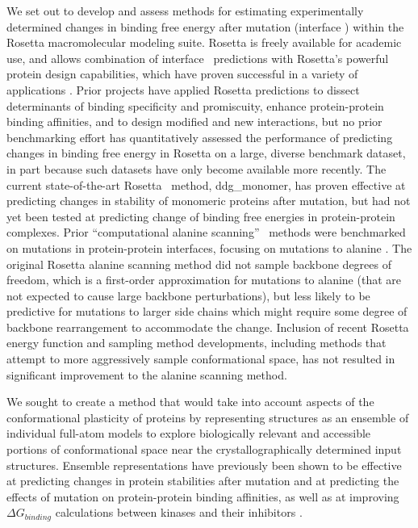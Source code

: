 We set out to develop and assess methods for estimating experimentally determined changes in binding free energy after mutation (interface \ddg) within the Rosetta macromolecular modeling suite. Rosetta is freely available for academic use, and allows combination of interface \ddg\ predictions with Rosetta's powerful protein design capabilities, which have proven successful in a variety of applications \cite{mandell_computer-aided_2009,kaufmann_practically_2010}.
Prior projects have applied Rosetta predictions to
dissect determinants of binding specificity and promiscuity\cite{boulanger_convergent_2003,mcfarland_symmetry_2003},
enhance protein-protein binding affinities\cite{sammond_structure-based_2007,song_rational_2006},
and to design modified\cite{kapp_control_2012}
and new interactions\cite{chevalier_design_2002,fleishman_computational_2011,chevalier_massively_2017}, but no prior benchmarking effort has quantitatively assessed the performance of predicting changes in binding free energy in Rosetta on a large, diverse benchmark dataset, in part because such datasets have only become available more recently.
The current state-of-the-art Rosetta \ddg\ method,  ddg\_monomer\cite{kellogg_role_2011}, has proven effective at predicting changes in stability of monomeric proteins after mutation, but had not yet been tested at predicting change of binding free energies in protein-protein complexes.
Prior ``computational alanine scanning'' \ddg\ methods were benchmarked on mutations in protein-protein interfaces, focusing on mutations to alanine \cite{kortemme_simple_2002,kortemme_computational_2004,conchuir_web_2015}.
The original Rosetta alanine scanning method\cite{kortemme_simple_2002} did not sample backbone degrees of freedom, which is a first-order approximation for mutations to alanine (that are not expected to cause large backbone perturbations\cite{cunningham_high-resolution_1989}), but less likely to be predictive for mutations to larger side chains which might require some degree of backbone rearrangement to accommodate the change.
Inclusion of recent Rosetta energy function and sampling method developments, including methods that attempt to more aggressively sample conformational space, has not resulted in significant improvement to the alanine scanning method\cite{conchuir_web_2015}.

We sought to create a method that would take into account aspects of the conformational plasticity of proteins by representing structures as an ensemble of individual full-atom models to explore biologically relevant and accessible portions of conformational space near the crystallographically determined input structures.
Ensemble representations have previously been shown to be effective at predicting changes in protein stabilities after mutation and at predicting the effects of mutation on protein-protein binding affinities\cite{benedix_predicting_2009,davey_prediction_2015}, as well as at improving $\Delta G_{binding}$ calculations between kinases and their inhibitors \cite{araki_effect_2016}.

